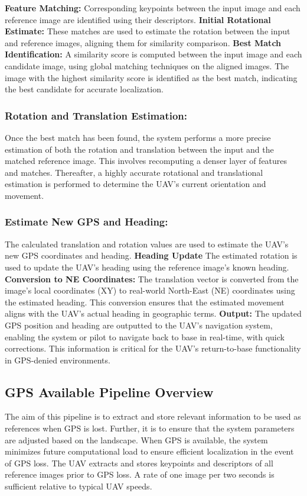 \textbf{Feature Matching:} Corresponding keypoints between the input image and each reference image are identified using their descriptors. 
\textbf{Initial Rotational Estimate:} These matches are used to estimate the rotation between the input and reference images, aligning them for similarity comparison.
\textbf{Best Match Identification:} A similarity score is computed between the input image and each candidate image, using global matching techniques on the aligned images. The image with the highest similarity score is identified as the best match, indicating the best candidate for accurate localization.


\subsubsection*{Rotation and Translation Estimation:}
Once the best match has been found, the system performs a more precise estimation of both the rotation and translation between the input and the matched reference image. This involves recomputing a denser layer of features and matches. Thereafter, a highly accurate rotational and translational estimation is performed to determine the UAV’s current orientation and movement.

\subsubsection*{Estimate New GPS and Heading:}
The calculated translation and rotation values are used to estimate the UAV's new GPS coordinates and heading.
\textbf{Heading Update}
The estimated rotation is used to update the UAV’s heading using the reference image’s known heading.
\textbf{Conversion to NE Coordinates:} The translation vector is converted from the image's local coordinates (XY) to real-world North-East (NE) coordinates using the estimated heading. This conversion ensures that the estimated movement aligns with the UAV’s actual heading in geographic terms.
\textbf{Output:} The updated GPS position and heading are outputted to the UAV’s navigation system, enabling the system or pilot to navigate back to base in real-time, with quick corrections. This information is critical for the UAV’s return-to-base functionality in GPS-denied environments.












\subsection*{GPS Available Pipeline Overview}
The aim of this pipeline is to extract and store relevant information to be used as references when GPS is lost. Further, it is to ensure that the system parameters are adjusted based on the landscape. 
When GPS is available, the system minimizes future computational load to ensure efficient localization in the event of GPS loss. The UAV extracts and stores keypoints and descriptors of all reference images prior to GPS loss. A rate of one image per two seconds is sufficient relative to typical UAV speeds. 

